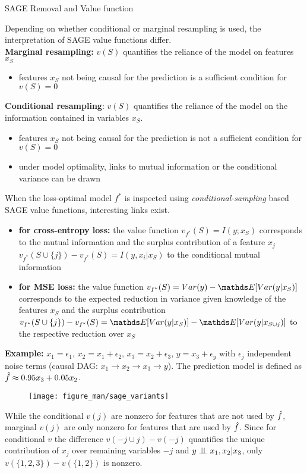 \documentclass[11pt,compress,t,notes=noshow, aspectratio=169, xcolor=table]{beamer}
\begin{document}
\begin{vbframe}[allowframebreaks]{SAGE Removal and Value function}

Depending on whether conditional or marginal resampling is used, the interpretation of SAGE value functions differ.\\
\lz
\textbf{Marginal resampling:} $v(S)$ quantifies the reliance of the model on features $x_S$
\begin{itemize}
  \item features $x_S$ not being causal for the prediction is a sufficient condition for $v(S) = 0$
\end{itemize}

\textbf{Conditional resampling}: $v(S)$ quantifies the reliance of the model on the information contained in variables $x_S$.
\begin{itemize}
  \item features $x_S$ not being causal for the prediction is not a sufficient condition for $v(S) = 0$
  \item under model optimality, links to mutual information or the conditional variance can be drawn
\end{itemize}

\framebreak

When the loss-optimal model $f^*$ is inspected using \textit{conditional-sampling} based SAGE value functions, interesting links exist.
\begin{itemize}
  \item \textbf{for cross-entropy loss:} the value function $v_{f^*}(S) = I(y;x_S)$ corresponds to the mutual information and the surplus contribution of a feature $x_j$ $v_{f^*}(S \cup \{j\}) - v_{f^*}(S) = I(y,x_i|x_S)$ to the conditional mutual information
  \item \textbf{for MSE loss:} the value function $v_{f^*}(S) = Var(y) - \E[Var(y|x_S)]$ corresponds to the expected reduction in variance given knowledge of the features $x_S$ and the surplus contribution $v_{f^*}(S \cup \{j\}) - v_{f^*}(S) = \E[Var(y|x_S)] - \E[Var(y|x_{S \cup {j}})]$ to the respective reduction over $x_S$
\end{itemize}

\framebreak

\textbf{Example:} $x_1 = \epsilon_1$, $x_2 = x_1 + \epsilon_2$, $x_3 = x_2 + \epsilon_3$, $y = x_3 + \epsilon_y$ with $\epsilon_j$ independent noise terms (causal DAG: $x_1 \rightarrow x_2 \rightarrow x_3 \rightarrow y$). The prediction model is defined as  $\hat{f} \approx 0.95 x_3 + 0.05 x_2$. 
%
\begin{figure}
  \texttt{[image: figure\_man/sage\_variants]}
\end{figure}
%
While the conditional $v(j)$ are nonzero for features that are not used by $\hat{f}$, marginal $v(j)$ are only nonzero for features that are used by $\hat{f}$. 
Since for conditional $v$ the difference $v(-j \cup j) - v(-j)$ quantifies the unique contribution of $x_j$ over remaining variables $-j$ and $y \perp \!\!\! \perp x_1, x_2 | x_3$, only $v(\{1,2,3\}) - v(\{1, 2\})$ is nonzero.
%
\end{vbframe}
\end{document}
